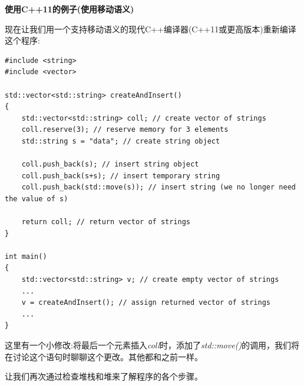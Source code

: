 \hspace*{\fill} \par %
\textbf{使用C++11的例子(使用移动语义)}

现在让我们用一个支持移动语义的现代C++编译器(C++11或更高版本)重新编译这个程序:\par

{\color{red}{basics/motiv11.cpp}}

\begin{lstlisting}[caption={}]
#include <string>
#include <vector>

std::vector<std::string> createAndInsert()
{
	std::vector<std::string> coll; // create vector of strings
	coll.reserve(3); // reserve memory for 3 elements
	std::string s = "data"; // create string object
	
	coll.push_back(s); // insert string object
	coll.push_back(s+s); // insert temporary string
	coll.push_back(std::move(s)); // insert string (we no longer need the value of s)
	
	return coll; // return vector of strings
}

int main()
{
	std::vector<std::string> v; // create empty vector of strings
	...
	v = createAndInsert(); // assign returned vector of strings
	...
}
\end{lstlisting}

这里有一个小修改:将最后一个元素插入\textit{coll}时，添加了\textit{std::move()}的调用，我们将在讨论这个语句时聊聊这个更改。其他都和之前一样。\par

让我们再次通过检查堆栈和堆来了解程序的各个步骤。\par

